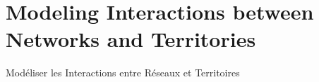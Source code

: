 

\chapter{Modeling Interactions between Networks and Territories}{Modéliser les Interactions entre Réseaux et Territoires} %

\label{ch:modelinginteractions} %





